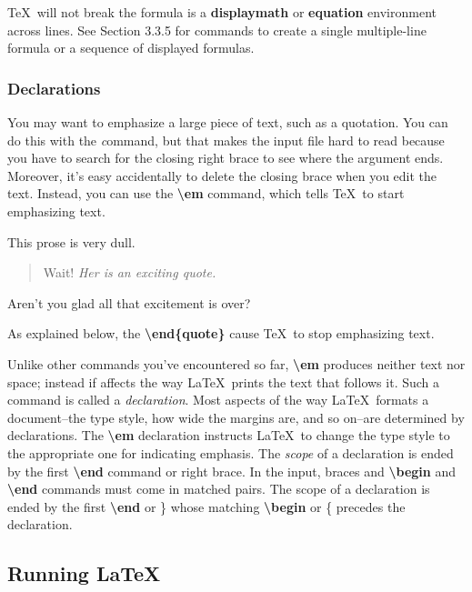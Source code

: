 \documentclass[twocolumn]{article}        %
\begin{document}
\TeX\ will not break the formula is a \textbf{displaymath} or \textbf{equation} environment across lines.
See Section 3.3.5 for commands to create a single multiple-line formula or a sequence of displayed formulas.

\subsubsection{Declarations}

You may want to emphasize a large piece of text, such as a quotation. You can do this with the \emph command, 
but that makes the input file hard to read because you have to search for the closing right brace to see where 
the argument ends. Moreover, it's easy accidentally to delete the closing brace when you edit the text. Instead, 
you can use the \textbf{\textbackslash em} command, which tells \TeX\ to start emphasizing text.

\hfill \break \noindent
This prose is very dull.
\begin{quote}
Wait! \em Her is an exciting quote.
\end{quote}
Aren't you glad all that excitement is over?

\hfill \break \noindent
As explained below, the \textbf{\textbackslash end\{quote\}} cause \TeX\ to stop emphasizing text.

Unlike other commands you've encountered so far, \textbf{\textbackslash em} produces neither text nor space;
instead if affects the way \LaTeX\ prints the text that follows it. Such a command is called a 
\emph{declaration}. Most aspects of the way \LaTeX\ formats a document--the type style, how wide the margins are,
and so on--are determined by declarations.
The \textbf{\textbackslash em} declaration instructs \LaTeX\ to change the type style to the appropriate one 
for indicating emphasis.
The \emph{scope} of a declaration is ended by the first \textbf{\textbackslash end} command or right brace.
In the input, braces and \textbf{\textbackslash begin} and \textbf{\textbackslash end} commands must come in
matched pairs. The scope of a declaration is ended by the first \textbf{\textbackslash end} or \} whose matching 
\textbf{\textbackslash begin} or \{ precedes the declaration.

\subsection{Running \LaTeX\ }
\end{document}
